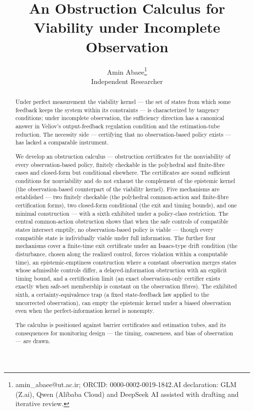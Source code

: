 \documentclass[11pt]{article}
\begin{document}
\title{An Obstruction Calculus for Viability under Incomplete Observation}
\author{Amin Abaee\thanks{amin\_abaee@ut.ac.ir; ORCID: 0000-0002-0019-1842.\newline AI declaration: GLM (Z.ai), Qwen (Alibaba Cloud) and DeepSeek AI assisted with drafting and iterative review.} \\ Independent Researcher}
\date{}
\maketitle

\begin{abstract}


Under perfect measurement the viability kernel --- the set of states
from which some feedback keeps the system within its constraints --- is
characterized by tangency conditions; under incomplete observation, the
sufficiency direction has a canonical answer in Veliov's output-feedback
regulation condition and the estimation-tube reduction. The necessity
side --- certifying that no observation-based policy exists --- has
lacked a comparable instrument.

We develop an obstruction calculus --- obstruction certificates for the
nonviability of every observation-based policy, finitely checkable in
the polyhedral and finite-fibre cases and closed-form but conditional
elsewhere. The certificates are sound sufficient conditions for
nonviability and do not exhaust the complement of the epistemic kernel
(the observation-based counterpart of the viability kernel). Five
mechanisms are established --- two finitely checkable (the polyhedral
common-action and finite-fibre certification forms), two closed-form
conditional (the exit and timing bounds), and one minimal construction
--- with a sixth exhibited under a policy-class restriction. The central
common-action obstruction shows that when the safe controls of
compatible states intersect emptily, no observation-based policy is
viable --- though every compatible state is individually viable under
full information. The further four mechanisms cover a finite-time exit
certificate under an Isaacs-type drift condition (the disturbance,
chosen along the realized control, forces violation within a computable
time), an epistemic-emptiness construction where a constant observation
merges states whose admissible controls differ, a delayed-information
obstruction with an explicit timing bound, and a certification limit (an
exact observation-only certifier exists exactly when safe-set membership
is constant on the observation fibres). The exhibited sixth, a
certainty-equivalence trap (a fixed state-feedback law applied to the
uncorrected observation), can empty the epistemic kernel under a biased
observation even when the perfect-information kernel is nonempty.

The calculus is positioned against barrier certificates and estimation
tubes, and its consequences for monitoring design --- the timing,
coarseness, and bias of observation --- are drawn.

\end{abstract}
\end{document}
